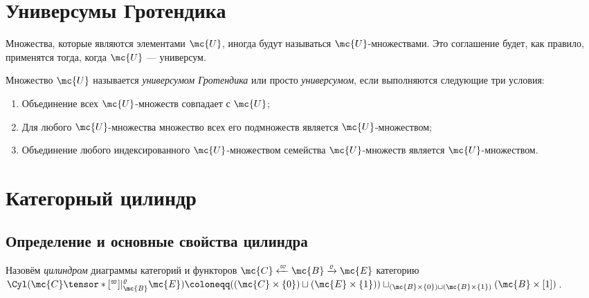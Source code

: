 \documentclass[
	extrafontsizes,
	11pt,
	hyphens,
]{memoir}
\begin{document}
\section{Универсумы Гротендика}

\begin{convention}
Множества, которые являются элементами \(\mc{U}\), иногда будут называться \(\mc{U}\)-множествами.
Это соглашение будет, как правило, применятся тогда, когда \(\mc{U}\) --- универсум.
\end{convention}

\begin{definition}
Множество \(\mc{U}\) называется \emph{универсумом Гротендика} или просто \emph{универсумом}, если выполняются следующие три условия:
\begin{enumerate}[
	font=\upshape,
	label=\asbuk*),
	ref=\asbuk*,
	]

\item Объединение всех \(\mc{U}\)-множеств совпадает с \(\mc{U}\);

\item Для любого \(\mc{U}\)-мно\-же\-ства множество всех его подмножеств является \(\mc{U}\)-мно\-же\-ством;

\item Объединение любого индексированного \(\mc{U}\)-мно\-же\-ством семейства \(\mc{U}\)-множеств является \(\mc{U}\)-мно\-же\-ством.

\end{enumerate}
\end{definition}


\section{Категорный цилиндр}

\subsection{Определение и основные свойства цилиндра}

\begin{definition}
Назовём \emph{цилиндром} диаграммы категорий и функторов
\(\mc{C} \xleftarrow{\varpi} \mc{B} \xrightarrow{\varrho} \mc{E}\)
категорию
\(
\Cyl(\mc{C} \tensor*[^{\varpi}]{\mid}{^{\varrho}_{\mc{B}}} \mc{E})
\coloneqq
((\mc{C} \times \{0\}) \sqcup (\mc{E} \times \{1\}))
\sqcup_{(\mc{B} \times \{0\}) \sqcup (\mc{B} \times \{1\})}
(\mc{B} \times [1])
\).
\end{definition}
\end{document}
